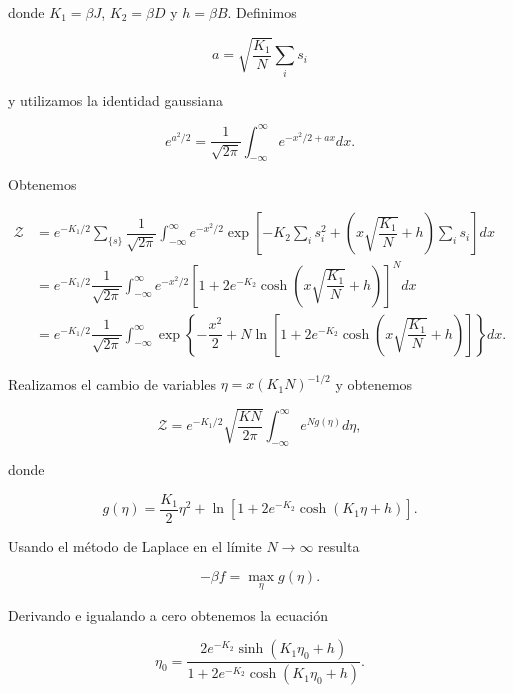 \documentclass[10pt]{article}
\begin{document}
donde $K_1 = \beta J$, $K_2 = \beta D$ y $h = \beta B$. Definimos 

\begin{equation}
a = \sqrt{\dfrac{K_1}{N}} \sum_i s_i
\end{equation}

y utilizamos la identidad gaussiana

\begin{equation}
e^{a^2/2} = \dfrac{1}{\sqrt{2\pi}}\int_{-\infty}^{\infty} e^{-x^2/2+ax} dx.
\end{equation}

Obtenemos

\begin{align}
\mathcal{Z} &= e^{-K_1/2} \sum_{\lbrace s \rbrace} \dfrac{1}{\sqrt{2\pi}}  \int_{-\infty}^{\infty} e^{-x^2/2} \exp \left[ - K_2 \sum_i s_i^2 + \left(x\sqrt{\dfrac{K_1}{N}} + h\right) \sum_i s_i \right] dx \nonumber \\
&= e^{-K_1/2} \dfrac{1}{\sqrt{2\pi}} \int_{-\infty}^{\infty} e^{-x^2/2} \left[1+  2 e^{-K_2}\cosh\left( x\sqrt{\dfrac{K_1}{N}} + h \right)\right]^N dx \nonumber \\
&= e^{-K_1/2} \dfrac{1}{\sqrt{2\pi}} \int_{-\infty}^{\infty} \exp\left\lbrace -\dfrac{x^2}{2} + N \ln\left[1+  2 e^{-K_2}\cosh\left( x\sqrt{\dfrac{K_1}{N}} + h \right)\right] \right\rbrace dx.
\end{align}

Realizamos el cambio de variables $\eta = x(K_1 N)^{-1/2}$ y obtenemos

\begin{equation}
\mathcal{Z} = e^{-K_1/2} \sqrt{\dfrac{KN}{2\pi}} \int_{-\infty}^{\infty} e^{Ng(\eta)} d\eta,
\end{equation}

donde

\begin{equation}
g(\eta) = \dfrac{K_1}{2}\eta^2 + \ln \left[1+ 2e^{-K_2}\cosh\left( K_1\eta + h \right) \right].
\end{equation}

Usando el m\'etodo de Laplace en el l\'imite $N\rightarrow\infty$ resulta

\begin{equation}
-\beta f = \max_{\eta} g(\eta).
\end{equation}

Derivando e igualando a cero obtenemos la ecuaci\'on

\begin{equation}
 \eta_0 = \dfrac{2e^{-K_2}\sinh\left( K_1\eta_0 + h \right)}{1+2e^{-K_2}\cosh\left( K_1\eta_0 + h \right)}.
\end{equation}
\end{document}
